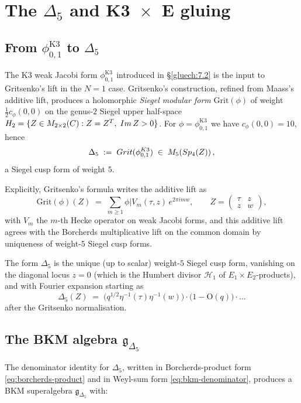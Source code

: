 \section{The $\Delta_5$ and K3~$\times$~E gluing}
\label{gluech:7.4}

\subsection{From $\phi_{0, 1}^{\mathrm{K3}}$ to $\Delta_5$}

The K3 weak Jacobi form $\phi_{0, 1}^{\mathrm{K3}}$ introduced in \S\ref{gluech:7.2} is the input to Gritsenko's lift in the $N = 1$ case. Gritsenko's construction, refined from Maass's additive lift, produces a holomorphic \emph{Siegel modular form} $\mathrm{Grit}(\phi)$ of weight $\tfrac12 c_\phi(0, 0)$ on the genus-$2$ Siegel upper half-space $H_2 = \{Z \in M_{2\times 2}(C) : Z = Z^T,\; Im\, Z > 0\}$. For $\phi = \phi_{0, 1}^{\mathrm{K3}}$ we have $c_\phi(0, 0) = 10$, hence
\[
  \Delta_5 \;:=\; Grit(\phi_{0, 1}^{K3}) \;\in\; M_5\!\left(Sp_4(Z)\right),
\]
a Siegel cusp form of weight $5$.

Explicitly, Gritsenko's formula writes the additive lift as
\[
  \mathrm{Grit}(\phi)(Z) \;=\; \sum_{m \geq 1} \phi|V_m(\tau, z) \, e^{2\pi i m w},
  \qquad Z = \begin{pmatrix} \tau & z \\ z & w \end{pmatrix},
\]
with $V_m$ the $m$-th Hecke operator on weak Jacobi forms, and this additive lift agrees with the Borcherds multiplicative lift on the common domain by uniqueness of weight-$5$ Siegel cusp forms.

The form $\Delta_5$ is the unique (up to scalar) weight-$5$ Siegel cusp form, vanishing on the diagonal locus $z = 0$ (which is the Humbert divisor $\mathcal H_1$ of $E_1 \times E_2$-products), and with Fourier expansion starting as
\[
  \Delta_5(Z) \;=\; \bigl(q^{1/2} \eta^{-1}(\tau) \eta^{-1}(w)\bigr) \cdot \bigl(1 - \text{O}(q)\bigr) \cdot \ldots
\]
after the Gritsenko normalisation.

\subsection{The BKM algebra $\mathfrak g_{\Delta_5}$}

The denominator identity for $\Delta_5$, written in Borcherds-product form \eqref{eq:borcherds-product} and in Weyl-sum form \eqref{eq:bkm-denominator}, produces a BKM superalgebra $\mathfrak g_{\Delta_5}$ with:

